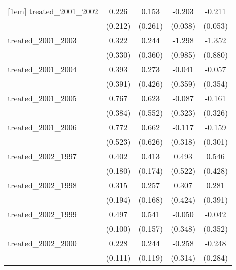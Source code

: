 {\begin{tabular}{l*{4}{c}}
[1em]
treated\_2001\_2002&       0.226         &       0.153         &      -0.203\sym{***}&      -0.211\sym{***}\\
            &     (0.212)         &     (0.261)         &     (0.038)         &     (0.053)         \\
[1em]
treated\_2001\_2003&       0.322         &       0.244         &      -1.298         &      -1.352         \\
            &     (0.330)         &     (0.360)         &     (0.985)         &     (0.880)         \\
[1em]
treated\_2001\_2004&       0.393         &       0.273         &      -0.041         &      -0.057         \\
            &     (0.391)         &     (0.426)         &     (0.359)         &     (0.354)         \\
[1em]
treated\_2001\_2005&       0.767\sym{*}  &       0.623         &      -0.087         &      -0.161         \\
            &     (0.384)         &     (0.552)         &     (0.323)         &     (0.326)         \\
[1em]
treated\_2001\_2006&       0.772         &       0.662         &      -0.117         &      -0.159         \\
            &     (0.523)         &     (0.626)         &     (0.318)         &     (0.301)         \\
[1em]
treated\_2002\_1997&       0.402\sym{*}  &       0.413\sym{*}  &       0.493         &       0.546         \\
            &     (0.180)         &     (0.174)         &     (0.522)         &     (0.428)         \\
[1em]
treated\_2002\_1998&       0.315         &       0.257         &       0.307         &       0.281         \\
            &     (0.194)         &     (0.168)         &     (0.424)         &     (0.391)         \\
[1em]
treated\_2002\_1999&       0.497\sym{***}&       0.541\sym{***}&      -0.050         &      -0.042         \\
            &     (0.100)         &     (0.157)         &     (0.348)         &     (0.352)         \\
[1em]
treated\_2002\_2000&       0.228\sym{*}  &       0.244\sym{*}  &      -0.258         &      -0.248         \\
            &     (0.111)         &     (0.119)         &     (0.314)         &     (0.284)         \\

\end{tabular}}
